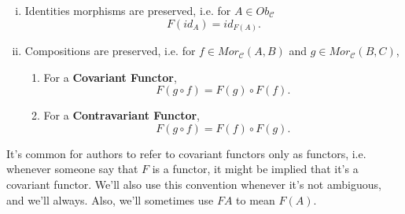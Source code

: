 \begin{definition}[Functor]
\begin{enumerate}[(i)]
		\item Identities morphisms are preserved, i.e. for $A \in Ob_\mathcal C$
		      \begin{displaymath}
			      F(id_A) =  id_{F(A)}.
		      \end{displaymath}
		\item Compositions are preserved, i.e. for $f \in Mor_\mathcal C(A,B)$
		      and $ g \in Mor_\mathcal C(B,C)$,
		      \begin{enumerate}
			      \item For a \textbf{Covariant Functor},
			            \begin{displaymath}
				            F(g \circ f) = F(g) \circ F(f).
			            \end{displaymath}
			      \item For a \textbf{Contravariant Functor},
			            \begin{displaymath}
				            F(g \circ f) = F(f) \circ F(g).
			            \end{displaymath}
		      \end{enumerate}
	\end{enumerate}
	It's common for authors to refer to covariant functors only as functors, i.e.
	whenever someone say that $F$ is a functor, it might be implied that it's a covariant functor.
	We'll also use this convention whenever it's not ambiguous, and we'll always.
	Also, we'll sometimes use $FA$ to mean $F(A)$.
	\label{def:functor}
\end{definition}

